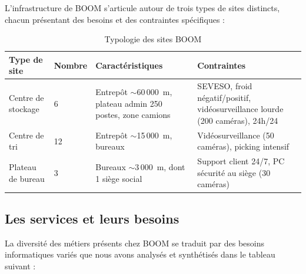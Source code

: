 \documentclass[12pt,a4paper]{report}
\begin{document}
L'infrastructure de BOOM s'articule autour de trois types de sites distincts, chacun présentant des besoins et des contraintes spécifiques :

\begin{table}[H]
\centering
\begin{tabularx}{\textwidth}{@{}L{3.1cm}C{1.8cm}L{4.2cm}L{5.1cm}@{}}
\toprule
\textbf{Type de site} & \textbf{Nombre} & \textbf{Caractéristiques} & \textbf{Contraintes} \\
\midrule
Centre de stockage & 6 & Entrepôt $\sim$60\,000~m, plateau admin 250 postes, zone camions & SEVESO, froid négatif/positif, vidéosurveillance lourde (200 caméras), 24h/24 \\
\addlinespace
Centre de tri & 12 & Entrepôt $\sim$15\,000~m, bureaux & Vidéosurveillance (50 caméras), picking intensif \\
\addlinespace
Plateau de bureau & 3 & Bureaux $\sim$3\,000~m, dont 1 siège social & Support client 24/7, PC sécurité au siège (30 caméras) \\
\bottomrule
\end{tabularx}
\caption{Typologie des sites BOOM}
\label{tab:sites}
\end{table}

\subsection{Les services et leurs besoins}

La diversité des métiers présents chez BOOM se traduit par des besoins informatiques variés que nous avons analysés et synthétisés dans le tableau suivant :
\end{document}
